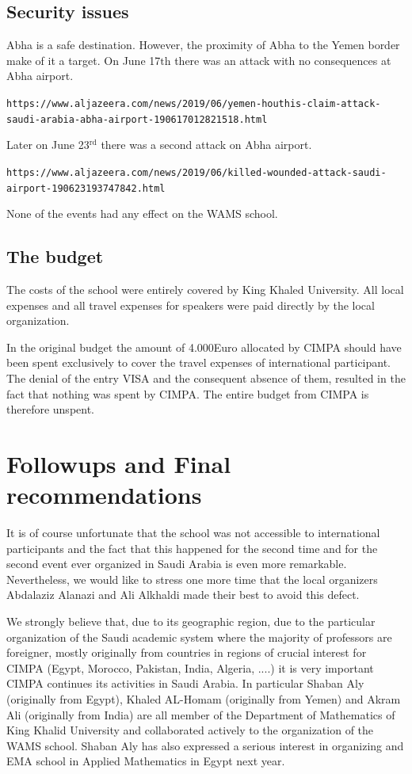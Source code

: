 \documentclass[12pt,a4paper]{scrartcl}
\begin{document}
\subsection*{Security issues}

Abha is a safe destination. However, the proximity of Abha to the Yemen border make of it a target.
On June 17${\text{th}}$ there was an attack with no consequences at Abha airport. 

{\scriptsize\texttt{https://www.aljazeera.com/news/2019/06/yemen-houthis-claim-attack-saudi-arabia-abha-airport-190617012821518.html}}

Later on June 23$^{\text{rd}}$ there was a second attack on Abha airport.

{\scriptsize\texttt{https://www.aljazeera.com/news/2019/06/killed-wounded-attack-saudi-airport-190623193747842.html}}

None of the events had any effect on the WAMS school.
\subsection*{The budget}

The costs of the school were entirely covered by King Khaled University. All local expenses and all travel expenses for speakers
were paid directly by the local organization. 

In the original budget the amount of 4.000Euro allocated by CIMPA should have been spent exclusively to cover the travel expenses of international participant. The denial of the entry VISA and the consequent absence of them, resulted in the fact that nothing
was spent by CIMPA. The entire budget from CIMPA is therefore unspent.
\section{Followups and Final recommendations}
It is of course unfortunate that the school was not accessible to international participants and the fact that this happened for 
the second time and for the second event ever organized in Saudi Arabia is even more remarkable.
Nevertheless, we would like to stress one more time that the local organizers Abdalaziz Alanazi and Ali Alkhaldi made their best to avoid this defect. 

We strongly believe that, due to its geographic region, due to the particular organization of the Saudi academic system where the majority
of professors are foreigner, mostly originally from countries in regions of crucial interest for CIMPA (Egypt, Morocco, Pakistan, India, Algeria, ....) it is very important CIMPA continues its activities in Saudi Arabia. In particular Shaban Aly (originally from Egypt), Khaled AL-Homam (originally from Yemen) and Akram Ali (originally from India) are all member of the Department of Mathematics of King Khalid University and collaborated actively to the organization of the WAMS school. Shaban Aly has also expressed a serious interest in organizing and EMA school in Applied Mathematics in Egypt next year.
\end{document}
